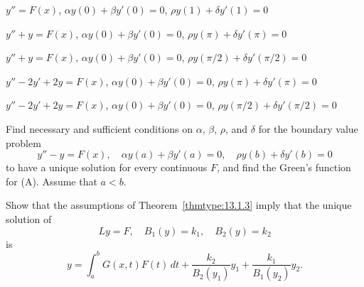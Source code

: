 \begin{exerciselist}
  \item\label{exer:13.1.26} $y''=F(x)$, \quad $\alpha y(0)+\beta y'(0)=0$, \quad
        $\rho y(1)+\delta y'(1)=0$

  \item\label{exer:13.1.27} $y''+y=F(x)$, \quad $\alpha y(0)+\beta y'(0)=0$, \quad
        $\rho y(\pi)+\delta y'(\pi)=0$

  \item\label{exer:13.1.28} $y''+y=F(x)$, \quad $\alpha y(0)+\beta y'(0)=0$, \quad
        $\rho y(\pi/2)+\delta y'(\pi/2)=0$

  \item\label{exer:13.1.29} $y''-2y'+2y=F(x)$, \quad $\alpha y(0)+\beta y'(0)=0$, \quad
        $\rho y(\pi)+\delta y'(\pi)=0$

  \item\label{exer:13.1.30} $y''-2y'+2y=F(x)$, \quad $\alpha y(0)+\beta y'(0)=0$, \quad
        $\rho y(\pi/2)+\delta y'(\pi/2)=0$

  \item\label{exer:13.1.31} Find necessary and sufficient conditions on $\alpha$, $\beta$, $\rho$,
        and $\delta$ for the boundary value problem
  \begin{equation}
    y''-y=F(x),\quad\alpha y(a)+\beta y'(a)=0,\quad \rho y(b)+\delta y'(b)=0\tag{A}
  \end{equation}
  to have a unique solution for every continuous $F$, and find the Green's function for (A). Assume
  that $a<b$.

  \item\label{exer:13.1.32} Show that the assumptions of Theorem~\ref{thmtype:13.1.3} imply that the
        unique solution of
  \[
    Ly=F,\quad B_{1}(y)=k_{1},\quad B_{2}(y)=k_{2}
  \]
  is
  \[
    y=\int_{a}^{b}G(x,t)F(t)\,dt+\frac{k_{2}}{B_{2}(y_{1})}y_{1}+\frac{k_{1}}{B_{1}(y_{2})}y_{2}.
  \]
\end{exerciselist}
